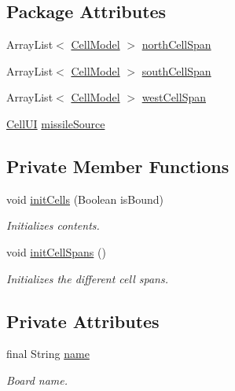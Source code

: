 \subsection*{Package Attributes}
\begin{DoxyCompactItemize}
\item 
Array\-List$<$ \hyperlink{classbattleship2D_1_1model_1_1CellModel}{Cell\-Model} $>$ \hyperlink{classbattleship2D_1_1ui_1_1BoardUI_a63fa6a70d952f7fa9daff2cc57682c46}{north\-Cell\-Span}
\item 
Array\-List$<$ \hyperlink{classbattleship2D_1_1model_1_1CellModel}{Cell\-Model} $>$ \hyperlink{classbattleship2D_1_1ui_1_1BoardUI_ac295e84c64a347a4d374f70948ea7080}{south\-Cell\-Span}
\item 
Array\-List$<$ \hyperlink{classbattleship2D_1_1model_1_1CellModel}{Cell\-Model} $>$ \hyperlink{classbattleship2D_1_1ui_1_1BoardUI_a0be656b4f354cb96b52ccd53ea6b7eb8}{west\-Cell\-Span}
\item 
\hyperlink{classbattleship2D_1_1ui_1_1CellUI}{Cell\-U\-I} \hyperlink{classbattleship2D_1_1ui_1_1BoardUI_a0362784460b94e92144f6dc02dcefc19}{missile\-Source}
\end{DoxyCompactItemize}
\subsection*{Private Member Functions}
\begin{DoxyCompactItemize}
\item 
void \hyperlink{classbattleship2D_1_1ui_1_1BoardUI_ae66ef7309a5ed62805221c24f0e37ebe}{init\-Cells} (Boolean is\-Bound)
\begin{DoxyCompactList}\small\item\em Initializes contents. \end{DoxyCompactList}\item 
void \hyperlink{classbattleship2D_1_1ui_1_1BoardUI_acbe908560c44abf6ae935943c8eb7604}{init\-Cell\-Spans} ()
\begin{DoxyCompactList}\small\item\em Initializes the different cell spans. \end{DoxyCompactList}\end{DoxyCompactItemize}
\subsection*{Private Attributes}
\begin{DoxyCompactItemize}
\item 
final String \hyperlink{classbattleship2D_1_1ui_1_1BoardUI_a7ad8f5d72803137c6ea6bde92a667c03}{name}
\begin{DoxyCompactList}\small\item\em Board name. \end{DoxyCompactList}\end{DoxyCompactItemize}


